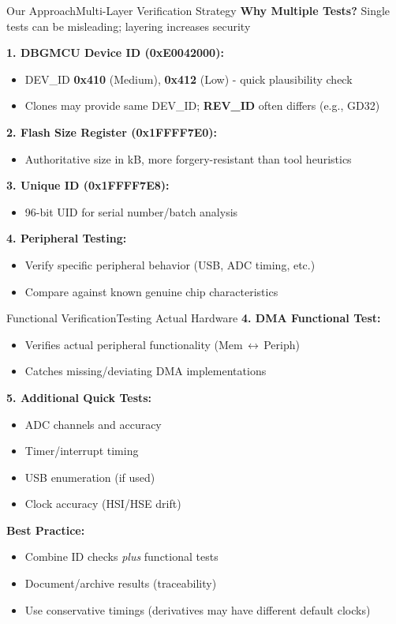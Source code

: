 \documentclass{beamer}
\begin{document}
\begin{frame}{Our Approach}{Multi-Layer Verification Strategy}
	\textbf{Why Multiple Tests?} Single tests can be misleading; layering increases security
	
	\smallskip
	\textbf{1. DBGMCU Device ID (0xE0042000):}
	\begin{itemize}
		\item DEV\_ID \textbf{0x410} (Medium), \textbf{0x412} (Low) - quick plausibility check
		\item Clones may provide same DEV\_ID; \textbf{REV\_ID} often differs (e.g., GD32)
	\end{itemize}
	
	\smallskip
	\textbf{2. Flash Size Register (0x1FFFF7E0):}
	\begin{itemize}
		\item Authoritative size in kB, more forgery-resistant than tool heuristics
	\end{itemize}
	
	\smallskip
	\textbf{3. Unique ID (0x1FFFF7E8):}
	\begin{itemize}
		\item 96-bit UID for serial number/batch analysis
	\end{itemize}
	
	\smallskip
	\textbf{4. Peripheral Testing:}
	\begin{itemize}
		\item Verify specific peripheral behavior (USB, ADC timing, etc.)
		\item Compare against known genuine chip characteristics
	\end{itemize}
\end{frame}
\begin{frame}{Functional Verification}{Testing Actual Hardware}
	\textbf{4. DMA Functional Test:}
	\begin{itemize}
		\item Verifies actual peripheral functionality (Mem\,$\leftrightarrow$\,Periph)
		\item Catches missing/deviating DMA implementations
	\end{itemize}
	
	\medskip
	\textbf{5. Additional Quick Tests:}
	\begin{itemize}
		\item ADC channels and accuracy
		\item Timer/interrupt timing
		\item USB enumeration (if used)
		\item Clock accuracy (HSI/HSE drift)
	\end{itemize}
	
	\medskip
	\textbf{Best Practice:}
	\begin{itemize}
		\item Combine ID checks \emph{plus} functional tests
		\item Document/archive results (traceability)
		\item Use conservative timings (derivatives may have different default clocks)
	\end{itemize}
\end{frame}
\end{document}
